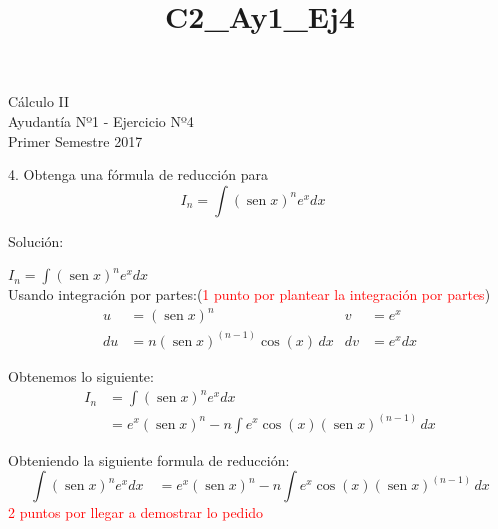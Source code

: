 \documentclass[a4paper,10pt]{article}
\title{C2_Ay1_Ej4}
\newcommand{\dis}{\displaystyle}
\def\sin{\operatorname{sen}}
\begin{document}
\begin{center}
Cálculo II\\
Ayudantía Nº1 - Ejercicio Nº4\\
Primer Semestre 2017
\end{center}





4. Obtenga una f\'{o}rmula de reducci\'{o}n para
$$I_n= \int (\sin x)^n e^x dx\quad$$


\vspace{5mm}

Solución:

$I_n= \dis \int (\sin x)^n e^x dx\quad$\\

Usando integración por partes:(\textcolor{red}{1 punto por plantear la integración por partes})
\begin{align*}
 u  &=  (\sin x)^n  &   v  &= e^x \\
 du &= n(\sin x)^{(n-1)} \cos(x)  \, dx     &   dv &= e^x dx
\end{align*}

Obtenemos lo siguiente:
\begin{align*}
 I_n &= \dis \int (\sin x)^n e^x dx\quad  \\
 		&= e^x(\sin x)^n  - n \dis \int e^x \cos(x)(\sin x)^{(n-1)}  \, dx
\end{align*}

Obteniendo la siguiente formula de reducción:$$\dis \int (\sin x)^n e^x dx\quad =e^x(\sin x)^n  - n \dis \int e^x \cos(x)(\sin x)^{(n-1)}  \, dx$$
\textcolor{red}{2 puntos por llegar a demostrar lo pedido}
\end{document}
